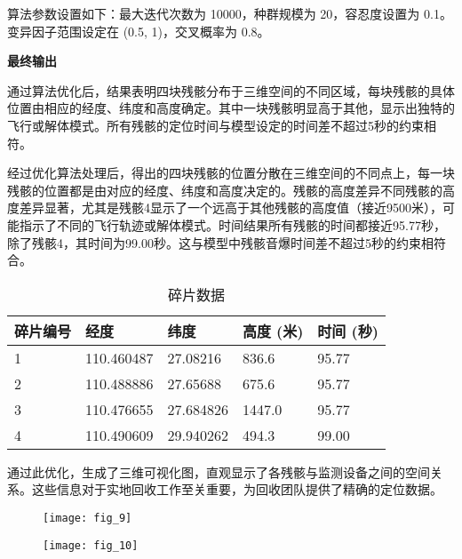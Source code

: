 \documentclass[withoutpreface,bwprint,12pt,a4paper]{cumcmthesis}
\begin{document}
算法参数设置如下：最大迭代次数为 10000，种群规模为 20，容忍度设置为 0.1。变异因子范围设定在 (0.5, 1)，交叉概率为 0.8。

\textbf{最终输出}

通过算法优化后，结果表明四块残骸分布于三维空间的不同区域，每块残骸的具体位置由相应的经度、纬度和高度确定。其中一块残骸明显高于其他，显示出独特的飞行或解体模式。所有残骸的定位时间与模型设定的时间差不超过5秒的约束相符。

经过优化算法处理后，得出的四块残骸的位置分散在三维空间的不同点上，每一块残骸的位置都是由对应的经度、纬度和高度决定的。残骸的高度差异不同残骸的高度差异显著，尤其是残骸4显示了一个远高于其他残骸的高度值（接近9500米），可能指示了不同的飞行轨迹或解体模式。时间结果所有残骸的时间都接近95.77秒，除了残骸4，其时间为99.00秒。这与模型中残骸音爆时间差不超过5秒的约束相符合。

\begin{table}[H]
    \centering
    \begin{tabular}{lllll}
        \toprule
        \textbf{碎片编号} & \textbf{经度} & \textbf{纬度} & \textbf{高度 (米)} & \textbf{时间 (秒)} \\
        \midrule
        1 & 110.460487 & 27.08216 & 836.6 & 95.77 \\
        2 & 110.488886 & 27.65688 & 675.6 & 95.77 \\
        3 & 110.476655 & 27.684826 & 1447.0 & 95.77 \\
        4 & 110.490609 & 29.940262 & 494.3 & 99.00 \\
        \bottomrule
    \end{tabular}
    \caption{碎片数据}
    \label{tab:fragment_data}
\end{table}


通过此优化，生成了三维可视化图，直观显示了各残骸与监测设备之间的空间关系。这些信息对于实地回收工作至关重要，为回收团队提供了精确的定位数据。
\begin{figure}[H]
    \centering
    \begin{minipage}{0.48\textwidth}
        \centering
        \texttt{[image: fig\_9]}
        \caption{} %
        \label{fig:4} %
    \end{minipage}
    \hfill %
    \begin{minipage}{0.5\textwidth}
        \centering
        \texttt{[image: fig\_10]}
        \caption{} %
        \label{fig:3} %
    \end{minipage}
\end{figure}
\end{document}
